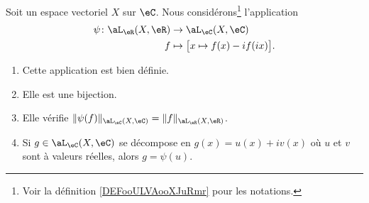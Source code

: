\begin{lemma}        \label{LEMooBZHIooSQJSnM}
	Soit un espace vectoriel \( X\) sur \( \eC\). Nous considérons\footnote{Voir la définition \ref{DEFooULVAooXJuRmr} pour les notations.} l'application
	\begin{equation}        \label{EQooLYYGooJfKIfu}
		\begin{aligned}
			\psi\colon \aL_{\eR}(X,\eR) & \to \aL_{\eC}(X,\eC)                      \\
			f                           & \mapsto \big[ x\mapsto f(x)-if(ix) \big].
		\end{aligned}
	\end{equation}
	\begin{enumerate}
		\item
		      Cette application est bien définie.
		\item
		      Elle est une bijection.
		\item		\label{ITEMooNVKBooIGhzWM}
		      Elle vérifie \( \| \psi(f) \|_{\aL_{\eC}(X,\eC)}=\| f \|_{\aL_{\eR}(X,\eR)}\).
		\item		\label{ITEMooTFWOooIIhcnZ}
		      Si \( g\in \aL_{\eC}(X,\eC)\) se décompose en \( g(x)=u(x)+iv(x)\) où \( u\) et \( v\) sont à valeurs réelles, alors \( g=\psi(u)\).
	\end{enumerate}
\end{lemma}

